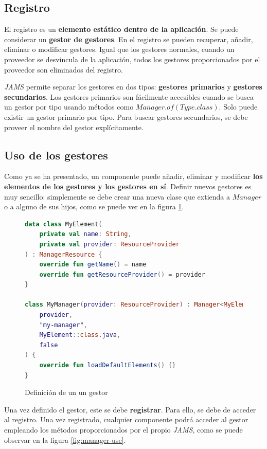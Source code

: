 \subsection{Registro}\label{subsec:registro}

El registro es un \textbf{elemento estático dentro de la aplicación}.
Se puede considerar un \textbf{gestor de gestores}.
En el registro se pueden recuperar, añadir, eliminar o modificar gestores.
Igual que los gestores normales, cuando un proveedor se desvincula de la aplicación,
todos los gestores proporcionados por el proveedor son eliminados del registro.

\noindent \textit{JAMS} permite separar los gestores en dos tipos:
\textbf{gestores primarios} y \textbf{gestores secundarios}.
Los gestores primarios son fácilmente accesibles cuando se busca un gestor por tipo
usando métodos como $Manager.of(Type.class)$.
Solo puede existir un gestor primario por tipo.
Para buscar gestores secundarios, se debe proveer el nombre del gestor explícitamente.

\subsection{Uso de los gestores}\label{subsec:uso-de-los-gestores}

Como ya se ha presentado, un componente puede añadir, eliminar
y modificar \textbf{los elementos de los gestores y los gestores en sí}.
Definir nuevos gestores es muy sencillo: simplemente se debe crear
una nueva clase que extienda a $Manager$ o a alguno de sus hijos,
como se puede ver en la figura \ref{fig:manager-definition}.

\begin{figure}[h]
    \centering
    \begin{lstlisting}[frame=single,label={lst:manager-definition},language=Kotlin]
data class MyElement(
    private val name: String,
    private val provider: ResourceProvider
) : ManagerResource {
    override fun getName() = name
    override fun getResourceProvider() = provider
}

class MyManager(provider: ResourceProvider) : Manager<MyElement>(
    provider,
    "my-manager",
    MyElement::class.java,
    false
) {
    override fun loadDefaultElements() {}
}
    \end{lstlisting}
    \caption{Definición de un un gestor}
    \label{fig:manager-definition}
\end{figure}

\noindent Una vez definido el gestor, este se debe \textbf{registrar}.
Para ello, se debe de acceder al registro.
Una vez registrado, cualquier componente podrá acceder al
gestor empleando los métodos proporcionados por el propio \textit{JAMS},
como se puede observar en la figura \ref{fig:manager-use}.

